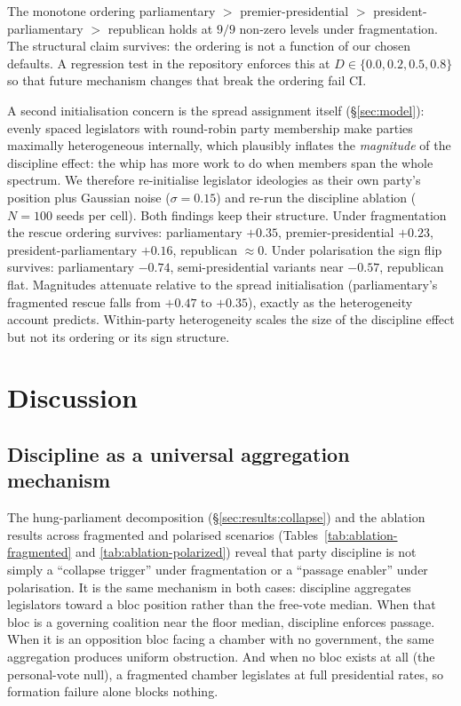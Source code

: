 \documentclass[11pt]{article}
\begin{document}
The monotone ordering parliamentary $>$ premier-presidential $>$
president-parliamentary $>$ republican holds at $9/9$ non-zero levels
under fragmentation. The structural claim survives: the ordering is not a
function of our chosen defaults. A regression test in the repository
enforces this at $D \in \{0.0, 0.2, 0.5, 0.8\}$ so that future mechanism
changes that break the ordering fail CI.

\label{sec:results:clustered}
A second initialisation concern is the spread assignment itself
(\S\ref{sec:model}): evenly spaced legislators with round-robin party
membership make parties maximally heterogeneous internally, which plausibly
inflates the \emph{magnitude} of the discipline effect: the whip has more
work to do when members span the whole spectrum. We therefore re-initialise
legislator ideologies as their own party's position plus Gaussian noise
($\sigma = 0.15$) and re-run the discipline ablation ($N=100$ seeds per
cell). Both findings keep their structure. Under fragmentation the rescue
ordering survives: parliamentary $+0.35$, premier-presidential $+0.23$,
president-parliamentary $+0.16$, republican $\approx 0$. Under polarisation
the sign flip survives: parliamentary $-0.74$, semi-presidential variants
near $-0.57$, republican flat. Magnitudes attenuate relative to the spread
initialisation (parliamentary's fragmented rescue falls from $+0.47$ to
$+0.35$), exactly as the heterogeneity account predicts. Within-party
heterogeneity scales the size of the discipline effect but not its ordering
or its sign structure.

\section{Discussion}
\label{sec:discussion}

\subsection{Discipline as a universal aggregation mechanism}

The hung-parliament decomposition (\S\ref{sec:results:collapse}) and the
ablation results across fragmented and polarised scenarios
(Tables~\ref{tab:ablation-fragmented} and \ref{tab:ablation-polarized})
reveal that party discipline is not simply a ``collapse trigger'' under
fragmentation or a ``passage enabler'' under polarisation. It is the same
mechanism in both cases: discipline aggregates legislators toward a bloc
position rather than the free-vote median. When that bloc is a governing
coalition near the floor median, discipline enforces passage. When it is an
opposition bloc facing a chamber with no government, the same aggregation
produces uniform obstruction. And when no bloc exists at all (the
personal-vote null), a fragmented chamber legislates at full presidential
rates, so formation failure alone blocks nothing.
\end{document}
